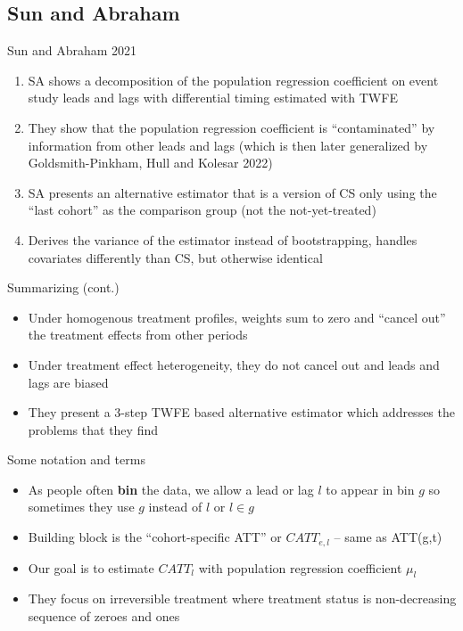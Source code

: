 \documentclass{beamer}
\begin{document}
\subsection{Sun and Abraham}

\begin{frame}{Sun and Abraham 2021}

	\begin{enumerate}
	\item SA shows a decomposition of the population regression coefficient on event study leads and lags with differential timing estimated with TWFE
	\item They show that the population regression coefficient is ``contaminated'' by information from other leads and lags (which is then later generalized by Goldsmith-Pinkham, Hull and Kolesar 2022)
	\item SA presents an alternative estimator that is a version of CS only using the ``last cohort'' as the comparison group (not the not-yet-treated)
	\item Derives the variance of the estimator instead of bootstrapping, handles covariates differently than CS, but otherwise identical
	\end{enumerate}

\end{frame}

\begin{frame}{Summarizing (cont.)}

\begin{itemize}
\item Under homogenous treatment profiles, weights sum to zero and ``cancel out'' the treatment effects from other periods 
\item Under treatment effect heterogeneity, they do not cancel out and leads and lags are biased
\item They present a 3-step TWFE based alternative estimator which addresses the problems that they find
\end{itemize}

\end{frame}


\begin{frame}{Some notation and terms}

\begin{itemize}
\item As people often \textbf{bin} the data, we allow a lead or lag $l$ to appear in bin $g$ so sometimes they use $g$ instead of $l$ or $l \in g$
\item Building block is the ``cohort-specific ATT'' or $CATT_{e,l}$ -- same as ATT(g,t)
\item Our goal is to estimate $CATT_{l}$ with population regression coefficient $\mu_l$
\item They focus on irreversible treatment where treatment status is non-decreasing sequence of zeroes and ones
\end{itemize}

\end{frame}
\end{document}
